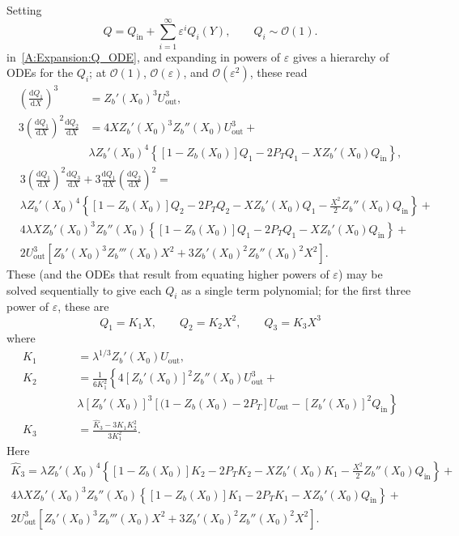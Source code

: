 \documentclass{jfm}
\newcommand{\dd}[2]{\frac{\mathrm{d} #1}{\mathrm{d} #2}}
\newcommand{\order}[1]{\mathcal{O}(#1)}
\newcommand{\Pt}{\textit{P}_T}
\renewcommand{\in}{\text{in}} %
\newcommand{\out}{\text{out}}
\begin{document}
Setting 
\begin{equation}
Q =    Q_\in  + \sum_{i = 1}^{\infty} \varepsilon^i Q_i(Y), \qquad Q_i \sim \order{1}.
 \end{equation}
in~\eqref{A:Expansion:Q_ODE}, and expanding in powers of $\varepsilon$ gives a hierarchy of ODEs for the $Q_i$; at $\order{1}$, $\order{\varepsilon}$, and $\order{\varepsilon^2}$, these read
\begin{align}
\left(\dd{Q_1}{X}\right)^3 &=  Z_b'(X_0)^3 U_\out^3,\\
3\left(\dd{Q_1}{X}\right)^2 \dd{Q_2}{X} &= 4X Z_b'(X_0)^3 Z_b''(X_0) U_\out^3 +\\ & \lambda Z_b'(X_0)^4\left\{\left[1 - Z_b(X_0)\right]Q_1 - 2\Pt Q_1 - X Z_b'(X_0)Q_\in\right\},
\end{align}
\begin{align}
&3\left(\dd{Q_1}{X}\right)^2 \dd{Q_3}{X} + 3 \dd{Q_1}{X}\left(\dd{Q_2}{X}\right)^2 =\\ &\lambda Z_b'(X_0)^4\left\{\left[1 - Z_b(X_0)\right]Q_2 - 2\Pt Q_2- X Z_b'(X_0)Q_1 - \frac{X^2}{2}Z_b''(X_0)Q_\in\right\} + \\
 &4 \lambda X Z_b'(X_0)^3 Z_b''(X_0)\left\{\left[1 - Z_b(X_0)\right]Q_1 - 2\Pt Q_1 - X Z_b'(X_0)Q_\in\right\} + \\
 &2U_\out^3\left[Z_b'(X_0)^3 Z_b'''(X_0) X^2 + 3Z_b'(X_0)^2 Z_b''(X_0)^2 X^2\right].
\end{align}
These (and the ODEs that result from equating higher powers of $\varepsilon$) may be solved sequentially to give each $Q_i$ as a single term polynomial; for the first three power of $\varepsilon$, these are
\begin{equation}
Q_1 = K_1 X, \qquad Q_2 = K_2 X^2, \qquad Q_3 = K_3 X^3
\end{equation}
where
\begin{align}
K_1 &= \lambda^{1/3} Z_b'(X_0) U_\out,\\
K_2 &= \frac{1}{6K_1^2}\left\{4\left[Z_b'(X_0)\right]^2 Z_b''(X_0)U_\out^3 \right. + \nonumber \\ \qquad \qquad &\left.  \lambda \left[Z_b'(X_0)\right]^3 \left[(1 - Z_b(X_0) - 2\Pt\right] U_\out - \left[Z_b'(X_0)\right]^2Q_\in\right\}\\
K_3 &= \frac{\hat{K}_3 - 3K_1 K_2^2}{3K_1^2}.
\end{align}
Here 
\begin{multline}
    \hat{K}_3  = \lambda Z_b'(X_0)^4\left\{\left[1 - Z_b(X_0)\right]K_2 - 2\Pt K_2- X Z_b'(X_0)K_1 - \frac{X^2}{2}Z_b''(X_0)Q_\in\right\} + \\
 4 \lambda X Z_b'(X_0)^3 Z_b''(X_0)\left\{\left[1 - Z_b(X_0)\right]K_1 - 2\Pt K_1 - X Z_b'(X_0)Q_\in\right\} + \\
 2U_\out^3\left[Z_b'(X_0)^3 Z_b'''(X_0) X^2 + 3Z_b'(X_0)^2 Z_b''(X_0)^2 X^2\right].
\end{multline}
\end{document}
